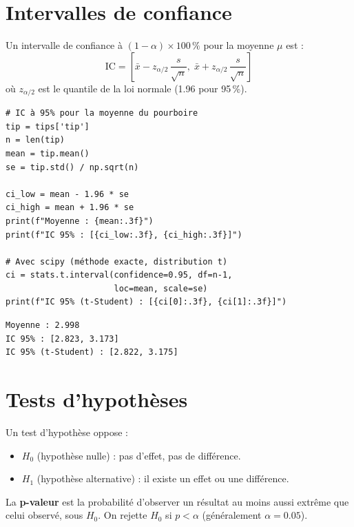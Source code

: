 \section{Intervalles de confiance}

\begin{definition}
Un intervalle de confiance \`a $(1-\alpha)\times 100\,\%$ pour la moyenne $\mu$ est :
\[
\text{IC} = \left[\bar{x} - z_{\alpha/2}\,\frac{s}{\sqrt{n}},\; \bar{x} + z_{\alpha/2}\,\frac{s}{\sqrt{n}}\right]
\]
o\`u $z_{\alpha/2}$ est le quantile de la loi normale (1.96 pour 95\,\%).
\end{definition}

\begin{codeblock}[title=\textbf{Python}]
\begin{verbatim}
# IC à 95% pour la moyenne du pourboire
tip = tips['tip']
n = len(tip)
mean = tip.mean()
se = tip.std() / np.sqrt(n)

ci_low = mean - 1.96 * se
ci_high = mean + 1.96 * se
print(f"Moyenne : {mean:.3f}")
print(f"IC 95% : [{ci_low:.3f}, {ci_high:.3f}]")

# Avec scipy (méthode exacte, distribution t)
ci = stats.t.interval(confidence=0.95, df=n-1,
                      loc=mean, scale=se)
print(f"IC 95% (t-Student) : [{ci[0]:.3f}, {ci[1]:.3f}]")
\end{verbatim}
\end{codeblock}

\begin{codeoutput}
\begin{verbatim}
Moyenne : 2.998
IC 95% : [2.823, 3.173]
IC 95% (t-Student) : [2.822, 3.175]
\end{verbatim}
\end{codeoutput}

\section{Tests d'hypoth\`eses}

\begin{definition}
Un test d'hypoth\`ese oppose :
\begin{itemize}
    \item $H_0$ (hypoth\`ese nulle) : pas d'effet, pas de diff\'erence.
    \item $H_1$ (hypoth\`ese alternative) : il existe un effet ou une diff\'erence.
\end{itemize}
La \textbf{p-valeur} est la probabilit\'e d'observer un r\'esultat au moins aussi extr\^eme que celui observ\'e, sous $H_0$. On rejette $H_0$ si $p < \alpha$ (g\'en\'eralement $\alpha = 0.05$).
\end{definition}

